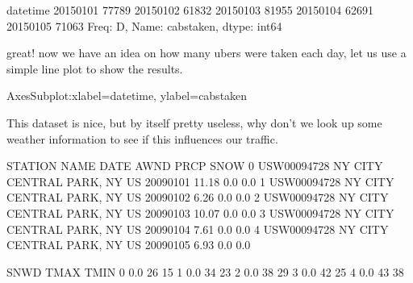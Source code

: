 \documentclass[letterpaper,10pt,english]{jupyterBook}
\begin{document}
\begin{sphinxVerbatim}[commandchars=\\\{\}]
datetime
2015\PYGZhy{}01\PYGZhy{}01    77789
2015\PYGZhy{}01\PYGZhy{}02    61832
2015\PYGZhy{}01\PYGZhy{}03    81955
2015\PYGZhy{}01\PYGZhy{}04    62691
2015\PYGZhy{}01\PYGZhy{}05    71063
Freq: D, Name: cabs\PYGZus{}taken, dtype: int64
\end{sphinxVerbatim}

\sphinxAtStartPar
great! now we have an idea on how many ubers were taken each day, let us use a simple line plot to show the results.

\begin{sphinxVerbatim}[commandchars=\\\{\}]
\end{sphinxVerbatim}

\begin{sphinxVerbatim}[commandchars=\\\{\}]
\PYGZlt{}AxesSubplot:xlabel=\PYGZsq{}datetime\PYGZsq{}, ylabel=\PYGZsq{}cabs\PYGZus{}taken\PYGZsq{}\PYGZgt{}
\end{sphinxVerbatim}

\noindent{}

\sphinxAtStartPar
This dataset is nice, but by itself pretty useless, why don’t we look up some weather information to see if this influences our traffic.

\begin{sphinxVerbatim}[commandchars=\\\{\}]
  
  
\end{sphinxVerbatim}

\begin{sphinxVerbatim}[commandchars=\\\{\}]
\end{sphinxVerbatim}

\begin{sphinxVerbatim}[commandchars=\\\{\}]
       STATION                         NAME        DATE   AWND  PRCP  SNOW  \PYGZbs{}
0  USW00094728  NY CITY CENTRAL PARK, NY US  2009\PYGZhy{}01\PYGZhy{}01  11.18   0.0   0.0   
1  USW00094728  NY CITY CENTRAL PARK, NY US  2009\PYGZhy{}01\PYGZhy{}02   6.26   0.0   0.0   
2  USW00094728  NY CITY CENTRAL PARK, NY US  2009\PYGZhy{}01\PYGZhy{}03  10.07   0.0   0.0   
3  USW00094728  NY CITY CENTRAL PARK, NY US  2009\PYGZhy{}01\PYGZhy{}04   7.61   0.0   0.0   
4  USW00094728  NY CITY CENTRAL PARK, NY US  2009\PYGZhy{}01\PYGZhy{}05   6.93   0.0   0.0   

   SNWD  TMAX  TMIN  
0   0.0    26    15  
1   0.0    34    23  
2   0.0    38    29  
3   0.0    42    25  
4   0.0    43    38  
\end{sphinxVerbatim}
\end{document}
